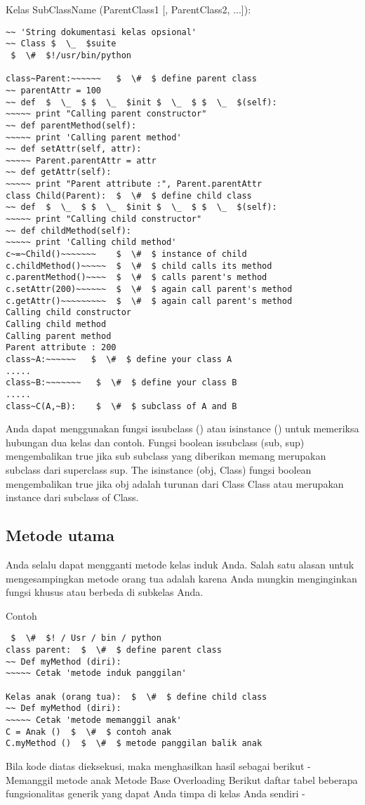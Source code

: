 Kelas SubClassName (ParentClass1 [, ParentClass2, ...]):
\begin{verbatim}
~~ 'String dokumentasi kelas opsional'
~~ Class $  \_  $suite
 $  \#  $!/usr/bin/python

class~Parent:~~~~~~   $  \#  $ define parent class
~~ parentAttr = 100
~~ def  $  \_  $ $  \_  $init $  \_  $ $  \_  $(self):
~~~~~ print "Calling parent constructor"
~~ def parentMethod(self):
~~~~~ print 'Calling parent method'
~~ def setAttr(self, attr):
~~~~~ Parent.parentAttr = attr
~~ def getAttr(self):
~~~~~ print "Parent attribute :", Parent.parentAttr
class Child(Parent):  $  \#  $ define child class
~~ def  $  \_  $ $  \_  $init $  \_  $ $  \_  $(self):
~~~~~ print "Calling child constructor"
~~ def childMethod(self):
~~~~~ print 'Calling child method'
c~=~Child()~~~~~~~    $  \#  $ instance of child
c.childMethod()~~~~~  $  \#  $ child calls its method
c.parentMethod()~~~~  $  \#  $ calls parent's method
c.setAttr(200)~~~~~~  $  \#  $ again call parent's method
c.getAttr()~~~~~~~~~  $  \#  $ again call parent's method
Calling child constructor
Calling child method
Calling parent method
Parent attribute : 200
class~A:~~~~~~   $  \#  $ define your class A
.....
class~B:~~~~~~~   $  \#  $ define your class B
.....
class~C(A,~B):    $  \#  $ subclass of A and B
\end{verbatim}

Anda dapat menggunakan fungsi issubclass () atau isinstance () untuk memeriksa hubungan dua kelas dan contoh. Fungsi boolean issubclass (sub, sup) mengembalikan true jika sub subclass yang diberikan memang merupakan subclass dari superclass sup. The isinstance (obj, Class) fungsi boolean mengembalikan true jika obj adalah turunan dari Class Class atau merupakan instance dari subclass of Class.

\subsection{Metode utama}
Anda selalu dapat mengganti metode kelas induk Anda. Salah satu alasan untuk mengesampingkan metode orang tua adalah karena Anda mungkin menginginkan fungsi khusus atau berbeda di subkelas Anda. \par
Contoh
\begin{verbatim}
 $  \#  $! / Usr / bin / python
class parent:  $  \#  $ define parent class
~~ Def myMethod (diri):
~~~~~ Cetak 'metode induk panggilan'

Kelas anak (orang tua):  $  \#  $ define child class
~~ Def myMethod (diri):
~~~~~ Cetak 'metode memanggil anak'
C = Anak ()  $  \#  $ contoh anak
C.myMethod ()  $  \#  $ metode panggilan balik anak
\end{verbatim}
Bila kode diatas dieksekusi, maka menghasilkan hasil sebagai berikut -
Memanggil metode anak
Metode Base Overloading
Berikut daftar tabel beberapa fungsionalitas generik yang dapat Anda timpa di kelas Anda sendiri -

